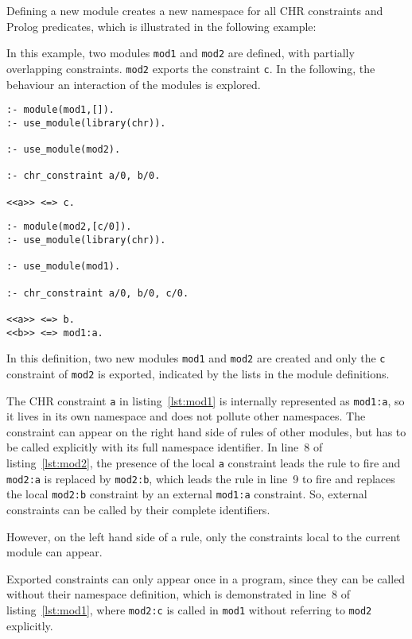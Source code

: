 Defining a new module creates a new namespace for all CHR constraints and Prolog predicates, which is illustrated in the following example:

\begin{example}

In this example, two modules \verb|mod1| and \verb|mod2| are defined, with partially overlapping constraints. \verb|mod2| exports the constraint \verb|c|. In the following, the behaviour an interaction of the modules is explored.

\begin{lstlisting}[caption={Definition of Module 1},label=lst:mod1]
:- module(mod1,[]).
:- use_module(library(chr)).

:- use_module(mod2).

:- chr_constraint a/0, b/0.

<<a>> <=> c.
\end{lstlisting}

\begin{lstlisting}[caption={Definition of Module 2},label=lst:mod2]
:- module(mod2,[c/0]).
:- use_module(library(chr)).

:- use_module(mod1).

:- chr_constraint a/0, b/0, c/0. 

<<a>> <=> b.
<<b>> <=> mod1:a.
\end{lstlisting}


In this definition, two new modules \verb|mod1| and \verb|mod2| are created and only the \verb|c| constraint of \verb|mod2| is exported, indicated by the lists in the module definitions.

The CHR constraint \verb|a| in listing~\ref{lst:mod1} is internally represented as \verb|mod1:a|, so it lives in its own namespace and does not pollute other namespaces. The constraint can appear on the right hand side of rules of other modules, but has to be called explicitly with its full namespace identifier. In line~8 of listing~\ref{lst:mod2}, the presence of the local \verb|a| constraint leads the rule to fire and \verb|mod2:a| is replaced by \verb|mod2:b|, which leads the rule in line~9 to fire and replaces the local \verb|mod2:b| constraint by an external \verb|mod1:a| constraint. So, external constraints can be called by their complete identifiers.

However, on the left hand side of a rule, only the constraints local to the current module can appear. 

Exported constraints can only appear once in a program, since they can be called without their namespace definition, which is demonstrated in line~8 of listing~\ref{lst:mod1}, where \verb|mod2:c| is called in \verb|mod1| without referring to \verb|mod2| explicitly.
\end{example}

